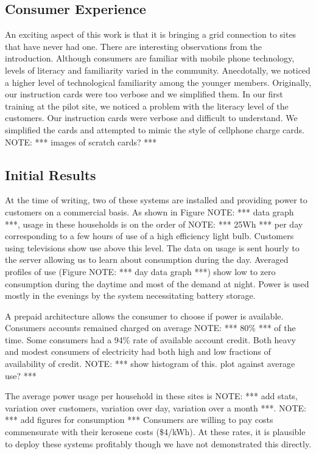 \documentclass[conference]{IEEEtran}
\newcommand{\note}[1]{{\color{red} NOTE: *** #1 ***}}
\begin{document}
\subsection{Consumer Experience}
An exciting aspect of this work is that it is bringing a grid connection
to sites that have never had one.  There are interesting observations from
the introduction.  Although consumers are familiar with mobile phone technology,
levels of literacy and familiarity varied in the community.  Anecdotally, we 
noticed a higher level of technological familiarity among the younger members.
Originally, our instruction cards were too verbose and we simplified them.
In our first training at the pilot site, we noticed a problem with the 
literacy level of the customers.  Our instruction cards were verbose and 
difficult to understand.  We simplified the cards and attempted to mimic 
the style of cellphone charge cards.
\note{images of scratch cards?}


\subsection{Initial Results}
At the time of writing, two of these systems are installed and providing
power to customers on a commercial basis.  
As shown in Figure \note{data graph}, usage in these households is on 
the order of \note{25Wh} per day corresponding to a few hours of use of
a high efficiency light bulb.  Customers using televisions show use above
this level.  The data on usage is sent hourly to the server allowing us
to learn about consumption during the day.  Averaged profiles of use 
(Figure \note{day data graph}) show low to zero consumption during the 
daytime and most of the demand at night.  Power is used mostly in
the evenings by the system necessitating battery storage.  

A prepaid architecture allows the consumer to choose if power is available.
Consumers accounts remained charged on average \note{80\%} of the time.  
Some consumers had a 94\% rate of available account credit.  Both heavy and
modest consumers of electricity had both high and low fractions of availability
of credit.  \note{show histogram of this.  plot against average use?}
 
The average power usage per
household in these sites is \note{add stats, variation over customers, 
variation over day, variation over a month}.  \note{add figures
for consumption}  Consumers are willing to pay costs commensurate with their 
kerosene costs (\$4/kWh).  At these rates, it is plausible to deploy these
systems profitably though we have not demonstrated this directly.
\end{document}
